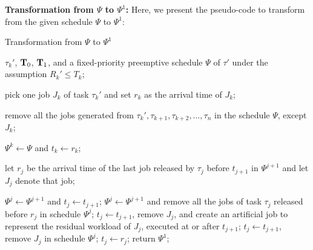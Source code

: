 {\bf Transformation from $\Psi$ to $\Psi^1$:}
Here, we present the pseudo-code to transform from the given schedule $\Psi$
to $\Psi^1$:
\begin{algorithm}[h]
  \caption{Transformation from $\Psi$ to $\Psi^1$}
     \begin{algorithmic}[1]\footnotesize
       \INPUT $\tau_k'$, ${\bf T}_0$, ${\bf T}_1$, and a
       fixed-priority preemptive schedule $\Psi$ of $\tau'$ under the
       assumption $R_k' \leq T_k$;

       \STATE pick one job $J_k$ of task $\tau_k'$ and set $r_k$ as
       the arrival time of $J_k$;

    \STATE remove all the jobs generated from $\tau_k', \tau_{k+1}, \tau_{k+2}, \ldots,
    \tau_n$ in the schedule $\Psi$, except $J_k$;

    \STATE $\Psi^k \leftarrow \Psi$ and $t_k \leftarrow r_k$; 

    
    \STATE let $r_j$ be the arrival time of the last
    job released by $\tau_j$ before $t_{j+1}$ in $\Psi^{j+1}$ and let
    $J_{j}$ denote that job;

    \STATE $\Psi^j \leftarrow \Psi^{j+1}$ and $t_j \leftarrow t_{j+1}$; 
    \ELSE
    \STATE $\Psi^j \leftarrow \Psi^{j+1}$ and remove all the jobs of task $\tau_j$ released before $r_j$
    in schedule $\Psi^j$;
     \STATE  $t_j \leftarrow t_{j+1}$, remove $J_j$, and  create an
     artificial job to represent the residual workload of $J_j$,
     executed at or after $t_{j+1}$; 
     \ELSE
     \STATE  $t_j \leftarrow t_{j+1}$, remove $J_j$ in schedule $\Psi^j$; 
     \ELSE
     \STATE  $t_j \leftarrow r_j$; 
     \ENDIF   
    \ENDIF
    \ENDIF
    \ENDFOR
    \STATE return $\Psi^1$;
  \end{algorithmic}
\end{algorithm}

